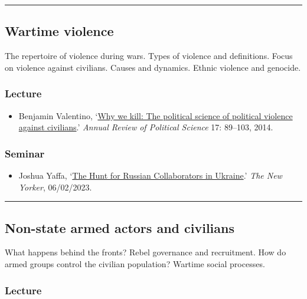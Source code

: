 \documentclass[12pt, a4paper]{article}
\begin{document}
\hrule %

\subsection{Wartime violence}

The repertoire of violence during wars. Types of violence and definitions. Focus on violence against civilians. Causes and dynamics. Ethnic violence and genocide.

\subsubsection*{Lecture}

\begin{itemize}
\setlength\itemsep{0pt}
\item Benjamin Valentino, `\href{https://doi.org/10.1146/annurev-polisci-082112-141937}{Why we kill: The political science of political violence against civilians}.' \textit{Annual Review of Political Science} 17: 89--103, 2014.
\end{itemize}

\subsubsection*{Seminar}

\begin{itemize}
\setlength\itemsep{0pt}
\item Joshua Yaffa, `\href{https://www.newyorker.com/magazine/2023/02/06/the-hunt-for-russian-collaborators-in-ukraine}{The Hunt for Russian Collaborators in Ukraine}.' \textit{The New Yorker}, 06/02/2023.
\end{itemize}

\hrule %

\subsection{Non-state armed actors and civilians}

What happens behind the fronts? Rebel governance and recruitment. How do armed groups control the civilian population? Wartime social processes.

\subsubsection*{Lecture}
\end{document}
